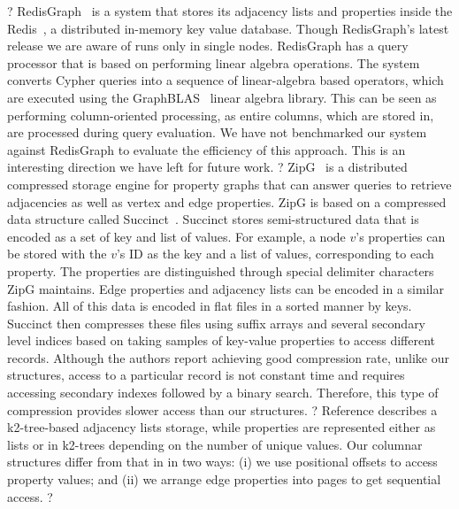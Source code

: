?
RedisGraph~\cite{redisgraph} is a system that stores its adjacency lists and properties inside the Redis~\cite{redis}, a distributed in-memory key value database. Though RedisGraph's latest release we are aware of runs only in single nodes. RedisGraph has a query processor that is based on performing linear algebra operations. The system converts Cypher queries into a sequence of linear-algebra based operators, which are executed using the GraphBLAS~\cite{graphblas} linear algebra library. This can be seen as performing column-oriented processing, as entire columns, which are stored in, are processed during query evaluation. We have not benchmarked our system against RedisGraph to evaluate the efficiency of this approach. This is an interesting direction we have left for future work.
?
ZipG~\cite{zipg} is a distributed compressed storage engine for property graphs that can answer queries to retrieve adjacencies as well as vertex and edge properties. ZipG is based on a compressed data structure called Succinct~\cite{succinct}. Succinct stores semi-structured data that is encoded as a set of key and list of values. For example, a node $v$'s properties can be stored with the $v$'s ID as the key and a list of values, corresponding to each property. The properties are distinguished through special delimiter characters ZipG maintains. Edge properties and adjacency lists can be encoded in a similar fashion. All of this data is encoded in flat files in a sorted manner by keys. Succinct then compresses these files using suffix arrays and several secondary level indices based on taking samples of key-value properties to access different records. Although the authors report achieving good compression rate, unlike our structures, access to a particular record is not constant time and requires accessing secondary indexes followed by a binary search. Therefore, this type of compression provides slower access than our structures. 
?
Reference \cite{compact-rep-graph} describes a k2-tree-based adjacency lists storage, while properties are represented either as lists or in k2-trees depending on the number of unique values. Our columnar structures differ from that in \cite{compact-rep-graph} in two ways: (i) we use positional offsets to access property values; and (ii) we arrange edge properties into pages to get sequential access.
?
